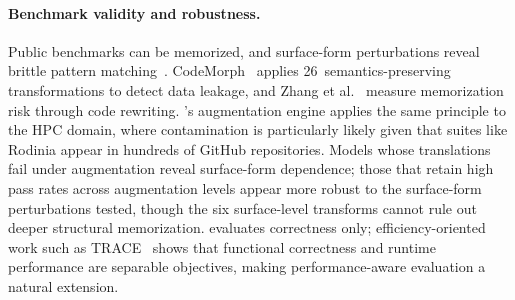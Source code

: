\paragraph{Benchmark validity and robustness.}
Public benchmarks can be memorized, and surface-form perturbations reveal brittle pattern matching~\cite{SWEbenchIllusion2025}. CodeMorph~\cite{CodeMorph2025} applies 26~semantics-preserving transformations to detect data leakage, and Zhang et al.~\cite{MemorizeOrGeneralize2025} measure memorization risk through code rewriting. \parbench{}'s augmentation engine applies the same principle to the HPC domain, where contamination is particularly likely given that suites like Rodinia appear in hundreds of GitHub repositories. Models whose translations fail under augmentation reveal surface-form dependence; those that retain high pass rates across augmentation levels appear more robust to the surface-form perturbations tested, though the six surface-level transforms cannot rule out deeper structural memorization. \parbench{} evaluates correctness only; efficiency-oriented work such as TRACE~\cite{TRACE2026} shows that functional correctness and runtime performance are separable objectives, making performance-aware evaluation a natural extension.
